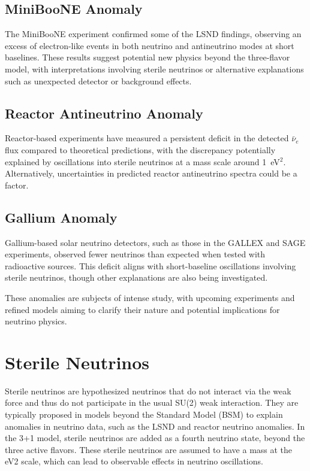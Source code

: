 \documentclass[a4paper,12pt,numbered]{article}
\begin{document}
\subsection{MiniBooNE Anomaly}  
The MiniBooNE experiment confirmed some of the LSND findings, observing an excess of electron-like events in both neutrino and antineutrino modes at short baselines. These results suggest potential new physics beyond the three-flavor model, with interpretations involving sterile neutrinos or alternative explanations such as unexpected detector or background effects.

\subsection{Reactor Antineutrino Anomaly}  
Reactor-based experiments have measured a persistent deficit in the detected $\bar{\nu}_e$ flux compared to theoretical predictions, with the discrepancy potentially explained by oscillations into sterile neutrinos at a mass scale around 1~eV$^2$. Alternatively, uncertainties in predicted reactor antineutrino spectra could be a factor.

\subsection{Gallium Anomaly}  
Gallium-based solar neutrino detectors, such as those in the GALLEX and SAGE experiments, observed fewer neutrinos than expected when tested with radioactive sources. This deficit aligns with short-baseline oscillations involving sterile neutrinos, though other explanations are also being investigated.

These anomalies are subjects of intense study, with upcoming experiments and refined models aiming to clarify their nature and potential implications for neutrino physics.


\section{Sterile Neutrinos}

Sterile neutrinos are hypothesized neutrinos that do not interact via the weak force and thus do not participate in the usual SU(2) weak interaction. They are typically proposed in models beyond the Standard Model (BSM) to explain anomalies in neutrino data, such as the LSND and reactor neutrino anomalies. In the 3+1 model, sterile neutrinos are added as a fourth neutrino state, beyond the three active flavors. These sterile neutrinos are assumed to have a mass at the eV2 scale, which can lead to observable effects in neutrino oscillations.
\end{document}
